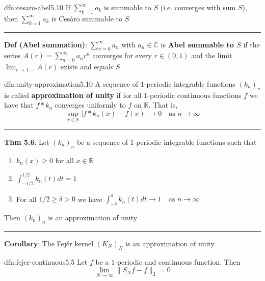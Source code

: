 \documentclass[landscape, 8pt]{extarticle}
\begin{document}
\begin{multicols}{3}
\begin{dfn}{dfn:cesaro-abel}{5.10}
	If $\sum_{k = 1}^{\infty} a_{k}$ is summable to $S$ (i.e. converges with sum $S$), then $\sum_{k = 1}^{\infty} a_{k}$ is Cesàro summable to $S$

	\noindent\rule{\textwidth}{0.2pt}
	\textbf{Def (Abel summation)}: $\sum_{n = 0}^{\infty}a_{n}$ with $a_{n}\in \mathbb{C}$ is \textbf{Abel summable to $S$} if the series $A(r) = \sum_{n = 0}^{\infty}a_{n}r^{n}$ converges for every $r\in(0,1)$ and the limit $\lim_{r\to 1-} A(r)$ exists and equals $S$
\end{dfn}

\vspace{-5pt}
\begin{dfn}{dfn:unity-approximation}{5.10}
	\vspace{-5pt}
	A sequence of $1$-periodic integrable functions $(k_{n})_{n}$ is called \textbf{approximation of unity} if for all $1$-periodic continuous functions $f$ we have that $f * k_{n}$ converges uniformly to $f$ on $\mathbb{R}$. That is,
	\[\sup_{x\in\mathbb{R}} \lvert f * k_{n}(x) - f(x) \rvert \to 0 \quad \text{as $n\to\infty$}\]

	\noindent\rule{\textwidth}{0.2pt}
	\textbf{Thm 5.6}: Let $(k_{n})_{n}$ be a sequence of $1$-periodic integrable functions such that
	\vspace{-5pt}
	\begin{enumerate}
	    \item $k_{n}(x) \ge 0$ for all $x\in\mathbb{R}$
	    \item $\int_{-1 /2}^{1 /2} k_{n}(t) dt = 1$
			\vspace{-8pt}
	    \item For all $1 /2 \ge \delta > 0$ we have $\displaystyle\int_{-\delta}^{\delta} k_{n}(t) dt \to 1 \quad\text{as $n\to\infty$}$
	\end{enumerate}

	\vspace{-5pt}
	Then $(k_{n})_{n}$ is an approximation of unity

	\vspace{-5pt}
	\noindent\rule{\textwidth}{0.2pt}
	\textbf{Corollary}: The Fejér kernel $(K_{N})_{N}$ is an approximation of unity
\end{dfn}

\vspace{-5pt}
\begin{lma}[]{dfn:fejer-continuous}{5.5}
	\vspace{-5pt}
	Let $f$ be a $1$-periodic and continuous function. Then
	\[\lim_{N\to \infty} \lVert S_{N} f - f \rVert_{2} = 0\]
\end{lma}


\end{multicols}
\end{document}
